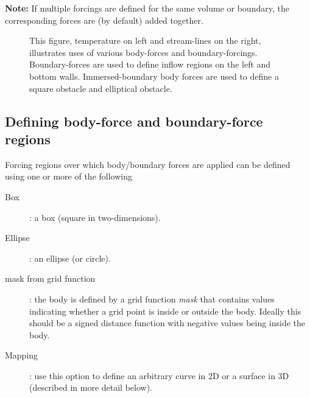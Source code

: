 {\bf Note:} If multiple forcings are defined for the same volume or boundary, the corresponding 
forces are (by default) added together. 


%
\begin{figure}[hbt]
\newcommand{\figWidth}{7.0cm}
\newcommand{\trimfig}[2]{\trimFig{#1}{#2}{0.23}{.225}{.2}{.22}}
\begin{center}
\end{center}
\caption{This figure, temperature on left and stream-lines on the right, 
    illustrates uses of various body-forces and boundary-forcings. 
Boundary-forces are
   used to define inflow regions on the left and bottom walls. Immersed-boundary body forces are used
  to define a square obstacle and elliptical obstacle.}
\end{figure}



\subsection{Defining body-force and boundary-force regions} \label{sec:bodyAndBoundaryForcingRegions}


Forcing regions over which body/boundary forces are applied can be defined
using one or more of the following 
\begin{description}
   \item[\quad Box] : a box (square in two-dimensions). 
   \item[\quad Ellipse] : an ellipse (or circle).
   \item[\quad mask from grid function]: the body is defined by a grid function {\em mask} that contains values
        indicating whether a grid point is inside or outside the body. Ideally this should be a signed
        distance function with negative values being inside the body. 
   \item[\quad Mapping] : use this option to define an arbitrary curve in 2D or a surface in 3D (described in more detail below). 
\end{description}

